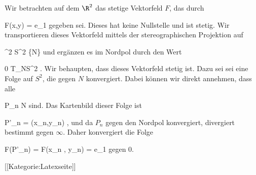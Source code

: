 Wir betrachten auf dem $\R^2$ das stetige Vektorfeld $F$, das durch

\mavergleichskettedisp
{\vergleichskette
{F(x,y)
}
{ =} { {  }  e_1
}
{ } {
}
{ } {
}
{ } {
}
}
{}{}{}
gegeben sei. Dieses hat keine Nullstelle und ist stetig. Wir transportieren dieses Vektorfeld mittels der stereographischen Projektion auf

\mavergleichskette
{\vergleichskette
{  \R^2
}
{ \cong }{ S^2 \setminus \{N\}
}
{  }{
}
{    }{
}
{   }{
}
}
{}{}{}
und ergänzen es im Nordpol durch den Wert

\mavergleichskette
{\vergleichskette
{ 0
}
{ \in }{  T_NS^2
}
{  }{
}
{    }{
}
{   }{
}
}
{}{}{.}
Wir behaupten, dass dieses Vektorfeld stetig ist. Dazu sei
 sei eine Folge auf $S^2$, die gegen $N$ konvergiert. Dabei können wir direkt annehmen, dass alle

\mavergleichskette
{\vergleichskette
{P_n
}
{ \neq }{N
}
{  }{
}
{    }{
}
{   }{
}
}
{}{}{}
sind. Das Kartenbild dieser Folge ist

\mavergleichskettedisp
{\vergleichskette
{P'_n
}
{ =} { (x_n,y_n)
}
{ } {
}
{ } {
}
{ } {
}
}
{}{}{,}
und da $P_n$ gegen den Nordpol konvergiert, divergiert
 bestimmt gegen $\infty$. Daher konvergiert die Folge

\mavergleichskettedisp
{\vergleichskette
{ F(P'_n)
}
{ =} { F(x_n , y_n)
}
{ =} { {  } e_1
}
{ } {
}
{ } {
}
}
{}{}{}
gegen $0$.

 [[Kategorie:Latexseite]]

